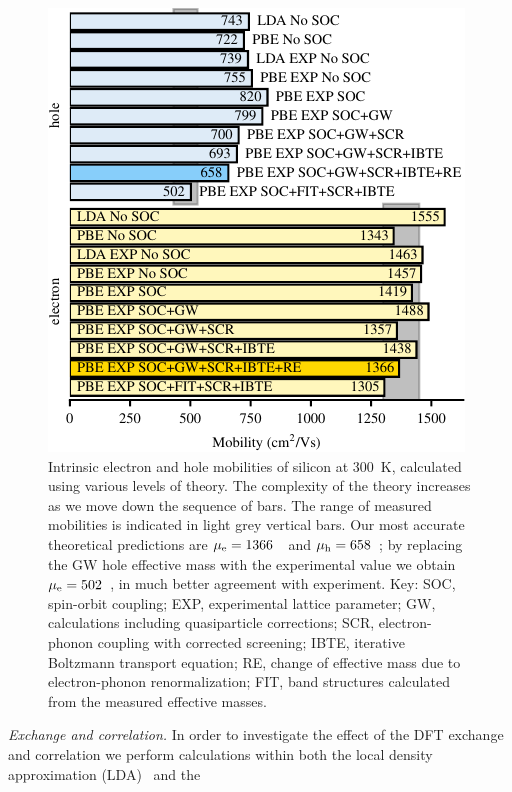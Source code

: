 \documentclass[aps,prl,twocolumn,superscriptaddress]{revtex4-1}
\begin{document}
\begin{figure}
  \centering
  \includegraphics[width=\columnwidth]{fig1.pdf}
  \caption{\label{fig1}
  Intrinsic electron and hole mobilities of silicon at 300~K, calculated using various levels of theory.
  The complexity of the theory increases as we move down the sequence of bars. The range of measured
  mobilities is indicated in light grey vertical bars. Our most accurate theoretical predictions are 
  $\mu_{\rm e} = 1366$~\mobun\ and $\mu_{\rm h} = 658$~\mobun;   by replacing the GW
  hole effective mass with the experimental value we obtain $\mu_{\rm e} = 502$~\mobun, in much better agreement
  with experiment. Key: SOC, spin-orbit coupling; EXP, experimental lattice parameter; 
  GW, calculations including quasiparticle corrections;
  SCR, electron-phonon coupling with corrected screening; 
  IBTE, iterative Boltzmann transport equation;
  RE, change of effective mass due to electron-phonon renormalization;
  FIT, band structures calculated from the measured effective masses.
  }
\end{figure}
{\it Exchange and correlation.}
In order to investigate the effect of the DFT exchange and correlation we perform calculations
within both the local density approximation (LDA)~\cite{Ceperley1980,Perdew1981} and the 
\end{document}
